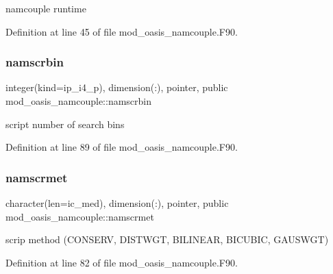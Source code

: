 namcouple runtime 



Definition at line 45 of file mod\+\_\+oasis\+\_\+namcouple.\+F90.

\mbox{\label{namespacemod__oasis__namcouple_a728405e8f669b58d00c189abf8b62437}} 
\subsubsection{\texorpdfstring{namscrbin}{namscrbin}}
{\footnotesize\ttfamily integer(kind=ip\+\_\+i4\+\_\+p), dimension(\+:), pointer, public mod\+\_\+oasis\+\_\+namcouple\+::namscrbin}



script number of search bins 



Definition at line 89 of file mod\+\_\+oasis\+\_\+namcouple.\+F90.

\mbox{\label{namespacemod__oasis__namcouple_a51c19e0892a72acc3dca2adb046ed175}} 
\subsubsection{\texorpdfstring{namscrmet}{namscrmet}}
{\footnotesize\ttfamily character(len=ic\+\_\+med), dimension(\+:), pointer, public mod\+\_\+oasis\+\_\+namcouple\+::namscrmet}



scrip method (C\+O\+N\+S\+E\+RV, D\+I\+S\+T\+W\+GT, B\+I\+L\+I\+N\+E\+AR, B\+I\+C\+U\+B\+IC, G\+A\+U\+S\+W\+GT) 



Definition at line 82 of file mod\+\_\+oasis\+\_\+namcouple.\+F90.

\mbox{\label{namespacemod__oasis__namcouple_a20d614468823744b82118ee8cf2df852}} 
